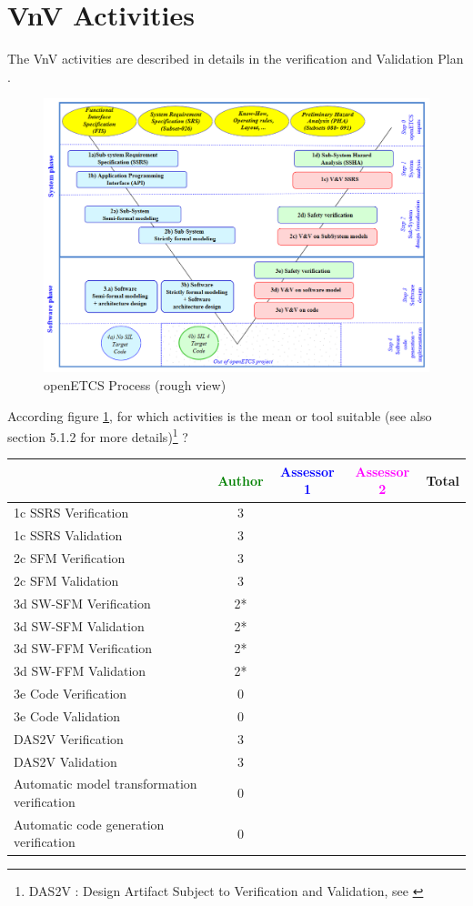 \section{VnV Activities}

The VnV activities are described in details in the verification and Validation Plan  \citep{D4.1}.

\begin{figure}[htb]
  \centering
  \includegraphics[width=.9\textwidth]{images/ProcessOpenETCS-BeM.png}
  \caption{openETCS Process (rough view)}
  \label{fig:openETCSProcess}
\end{figure}

According figure \ref{fig:openETCSProcess}, for which activities is the mean or tool suitable (see also \citep{D4.1} section 5.1.2 for more details)\footnote{DAS2V : Design Artifact Subject to Verification and Validation, see \citep{D4.1}} ?


\begin{tabular}{|l | c | c | c | c|}
\hline
& \textcolor{green}{Author} & \textcolor{blue}{Assessor 1} & \textcolor{magenta}{Assessor 2} & Total \\
\hline 
1c SSRS Verification & 3& & &  \\
\hline
1c SSRS Validation & 3& & &  \\
\hline
2c SFM Verification & 3& & &  \\
\hline
2c SFM Validation & 3& & &  \\
\hline
3d SW-SFM Verification & 2*& & &  \\
\hline
3d SW-SFM Validation & 2*& & &  \\
\hline
3d SW-FFM Verification & 2*& & &  \\
\hline
3d SW-FFM Validation & 2*& & &  \\
\hline
3e Code Verification & 0& & &  \\
\hline
3e Code Validation & 0& & &  \\
\hline
DAS2V Verification & 3& & &  \\
\hline
DAS2V Validation & 3& & &  \\
\hline
Automatic model transformation verification & 0& & &  \\
\hline
Automatic code generation verification & 0& & &  \\
\hline
\end{tabular}


